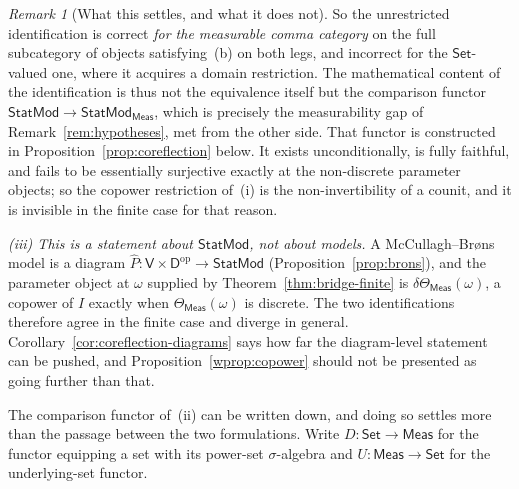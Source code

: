 \documentclass[11pt,a4paper]{article}
\theoremstyle{plain}
\theoremstyle{definition}
\theoremstyle{remark}
\newtheorem{caveat}[theorem]{Remark}
\newcommand{\cat}[1]{\mathsf{#1}}
\newcommand{\catV}{\cat{V}}
\newcommand{\catD}{\cat{D}}
\newcommand{\Meas}{\cat{Meas}}
\newcommand{\Set}{\cat{Set}}
\newcommand{\op}{\mathrm{op}}
\newcommand{\del}{\delta}
\newcommand{\StatMod}{\cat{StatMod}}
\newcommand{\Statk}{\StatMod_{\Meas}}
\begin{document}
\begin{caveat}[What this settles, and what it does not]
So the unrestricted identification is correct \emph{for the measurable comma
category} on the full subcategory of objects satisfying~(b) on both legs, and
incorrect for the $\Set$-valued one, where it acquires a domain restriction.
The
mathematical content of the identification is thus not the equivalence itself but the
comparison functor $\StatMod \to \Statk$, which is precisely the
measurability gap of Remark~\ref{rem:hypotheses}, met from the other side.
That functor is constructed in Proposition~\ref{prop:coreflection} below. It
exists unconditionally, is fully faithful, and fails to be essentially
surjective exactly at the non-discrete parameter objects; so the copower
restriction of~(i) is the non-invertibility of a
counit, and it is invisible in the finite case for that reason.

\emph{(iii) This is a statement about $\StatMod$, not about models.} A
McCullagh--Br\o ns model is a diagram
$\widehat{P} \colon \catV\times\catD^{\op} \to \StatMod$
(Proposition~\ref{prop:brons}), and the parameter object at $\omega$ supplied
by Theorem~\ref{thm:bridge-finite} is $\del\Theta_\Meas(\omega)$, a copower of
$I$ exactly when $\Theta_\Meas(\omega)$ is discrete. The two identifications
therefore agree in the finite case and diverge in general.
Corollary~\ref{cor:coreflection-diagrams} says how far the diagram-level
statement can be pushed, and Proposition~\ref{wprop:copower} should not be
presented as going further than that.
\end{caveat}

The comparison functor of~(ii) can be written down, and doing so settles more
than the passage between the two formulations. Write
$D \colon \Set \to \Meas$ for the functor equipping a set with its power-set
$\sigma$-algebra and $U \colon \Meas \to \Set$ for the underlying-set functor.
\end{document}
